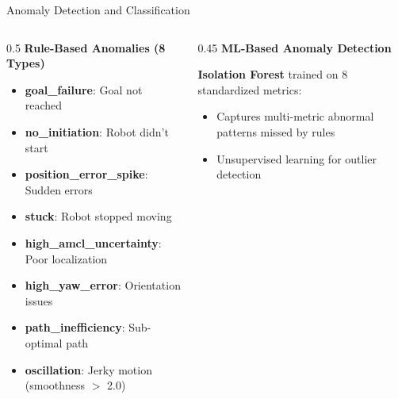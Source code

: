 \documentclass[aspectratio=169, 11pt]{beamer}
\begin{document}
\begin{frame}{Anomaly Detection and Classification}
  \begin{columns}[T]
    \begin{column}{0.5\textwidth}
      \textbf{Rule-Based Anomalies (8 Types)}
      
      \vspace{0.2cm}
      
      \footnotesize
      \begin{itemize}
        \item \textbf{goal\_failure}: Goal not reached
        \item \textbf{no\_initiation}: Robot didn't start
        \item \textbf{position\_error\_spike}: Sudden errors
        \item \textbf{stuck}: Robot stopped moving
        \item \textbf{high\_amcl\_uncertainty}: Poor localization
        \item \textbf{high\_yaw\_error}: Orientation issues
        \item \textbf{path\_inefficiency}: Sub-optimal path
        \item \textbf{oscillation}: Jerky motion (smoothness $>$ 2.0)
      \end{itemize}
    \end{column}
    
    \begin{column}{0.45\textwidth}
      \textbf{ML-Based Anomaly Detection}
      
      \vspace{0.2cm}
      
      \small
      \textbf{Isolation Forest} trained on 8 standardized metrics:
      \begin{itemize}
        \item Captures multi-metric abnormal patterns missed by rules
        \item Unsupervised learning for outlier detection
      \end{itemize}
    \end{column}
  \end{columns}
\end{frame}
\end{document}
